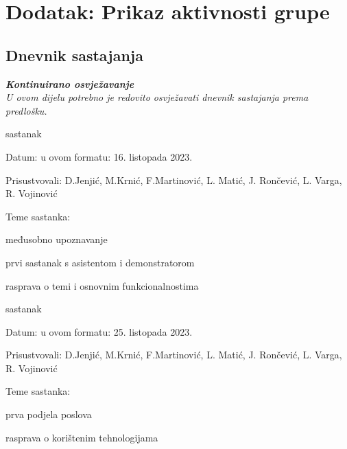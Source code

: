 \chapter*{Dodatak: Prikaz aktivnosti grupe}
		
		\section*{Dnevnik sastajanja}
		
		\textbf{\textit{Kontinuirano osvježavanje}}\\
		
		 \textit{U ovom dijelu potrebno je redovito osvježavati dnevnik sastajanja prema predlošku.}
		
		\begin{packed_enum}
			\item  sastanak
			
			\item[] \begin{packed_item}

				\item Datum: u ovom formatu: 16. listopada 2023.
				\item Prisustvovali: D.Jenjić, M.Krnić, F.Martinović, L. Matić, J. Rončević, L. Varga, R. Vojinović
				\item Teme sastanka:
				\begin{packed_item}
					\item  međusobno upoznavanje
					\item  prvi sastanak s asistentom i demonstratorom
					\item  rasprava o temi i osnovnim funkcionalnostima 
				\end{packed_item}
			\end{packed_item}
		
			
			\item  sastanak
			\item[] \begin{packed_item}
				\item Datum: u ovom formatu: 25. listopada 2023.
				\item Prisustvovali:  D.Jenjić, M.Krnić, F.Martinović, L. Matić, J. Rončević, L. Varga, R. Vojinović
				\item Teme sastanka:
				\begin{packed_item}
					\item  prva podjela poslova
					\item  rasprava o korištenim tehnologijama


\end{packed_item}
\end{packed_item}
\end{packed_enum}
